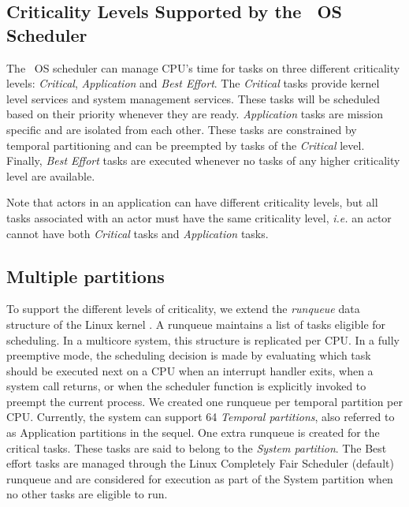 \subsection{Criticality Levels Supported by the \iap\ OS Scheduler}
\label{sec:criticality_levels}
The \iap\ OS scheduler can manage CPU's time
for tasks on three different criticality levels:
\emph{Critical}, \emph{Application} and \emph{Best Effort}.
The \emph{Critical} tasks provide kernel level services and system
management services. These tasks will be scheduled based on their
priority whenever they are ready. \emph{Application} tasks are
mission specific and are isolated from each other. These tasks are
constrained by temporal partitioning and can be preempted by tasks of the
\emph{Critical} level. Finally, \emph{Best Effort} tasks are executed
whenever no tasks of any higher criticality level are available.

Note that actors in an application can have different criticality levels,
but all tasks associated with an actor must have the same criticality
level, \emph{i.e.} an actor cannot have both \emph{Critical} tasks and
\emph{Application} tasks.

\subsection{Multiple partitions}
\label{sec:datastructure}
To support the different levels of criticality, we extend the \textit{runqueue} data structure of the Linux kernel \cite{garg2009real}. A runqueue maintains a list of tasks eligible for scheduling. %
In a multicore system, this structure is replicated per CPU. In a fully preemptive mode, the scheduling decision is made by  evaluating which task should be executed next on a CPU when an interrupt handler exits, when a system call returns, or when the scheduler function is explicitly invoked to preempt the current process.
We created one runqueue per temporal partition per CPU. Currently, the system can support 64 {\it Temporal partitions}, also referred to as Application partitions in the sequel. One extra runqueue is created for the critical tasks. These tasks are said to belong to the {\it System partition}.  The Best effort tasks are managed through the Linux Completely Fair Scheduler (default) runqueue and are considered for execution as part of the System partition when no other tasks are eligible to run. 



